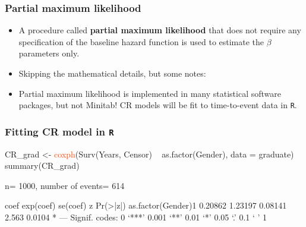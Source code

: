 \begin{frame}
\frametitle{Partial maximum likelihood}
\begin{itemize}
\item A procedure called \textbf{partial maximum likelihood} that does not require any specification of the baseline hazard function is used to estimate the $\beta$ parameters only.
\item Skipping the mathematical details, but some notes:

\item {Partial maximum likelihood} is implemented in many statistical software packages, but not Minitab!  CR models will be fit to time-to-event data in \texttt{R}.
\end{itemize}
\end{frame}

\begin{frame}[fragile]
\frametitle{Fitting CR model in \texttt{R}}
\begin{Rcode}{-.05}
CR_grad <- \textcolor{OrangeRed}{coxph}(Surv(Years, Censor) ~ as.factor(Gender),
                 data = graduate)
summary(CR_grad)
\end{Rcode}
\vskip5pt
\begin{Rout}{-.05}
  n= 1000, number of events= 614

                      coef exp(coef) se(coef)     z Pr(>|z|)
as.factor(Gender)1 0.20862   1.23197  0.08141 2.563   0.0104 *
---
Signif. codes:  0 ‘***’ 0.001 ‘**’ 0.01 ‘*’ 0.05 ‘.’ 0.1 ‘ ’ 1
\end{Rout}
\end{frame}


